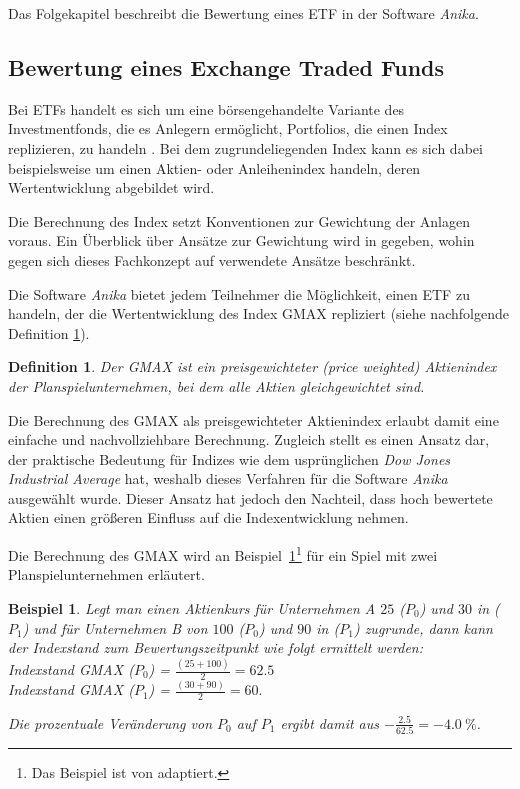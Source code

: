 \documentclass[12pt, a4paper]{article}
\theoremstyle{plain}
\newtheorem{definition}{Definition}
\newtheorem{example}{Beispiel}
\begin{document}
Das Folgekapitel beschreibt die Bewertung eines \gls{ETF} in der Software \textit{Anika}.

\subsection{Bewertung eines Exchange Traded Funds}
\label{sec:bewertung_eines_exchange_traded_funds}

Bei \glspl{ETF} handelt es sich um eine börsengehandelte Variante des Investmentfonds, die es Anlegern ermöglicht, Portfolios, die einen Index replizieren, zu handeln \autocite[][S.~103]{bodie_investments_2018}. Bei dem zugrundeliegenden Index kann es sich dabei beispielsweise um einen Aktien- oder Anleihenindex handeln, deren Wertentwicklung abgebildet wird.

Die Berechnung des Index setzt Konventionen zur Gewichtung der Anlagen voraus. Ein Überblick über Ansätze zur Gewichtung wird in \textcite[][S.~44~ff.]{bodie_investments_2018} gegeben, wohin gegen sich dieses Fachkonzept auf verwendete Ansätze beschränkt.

Die Software \textit{Anika} bietet jedem Teilnehmer die Möglichkeit, einen ETF zu handeln, der die Wertentwicklung des Index \gls{GMAX} repliziert (siehe nachfolgende Definition \ref{def:gmax}).

\begin{definition}
	\label{def:gmax}
	Der \gls{GMAX} ist ein preisgewichteter (\textit{price weighted}) Aktienindex der Planspielunternehmen, bei dem alle Aktien gleichgewichtet sind.
\end{definition}

Die Berechnung des \gls{GMAX} als preisgewichteter Aktienindex erlaubt damit eine einfache und nachvollziehbare Berechnung. Zugleich stellt es einen Ansatz dar, der praktische Bedeutung für Indizes wie dem usprünglichen \textit{Dow Jones Industrial Average} hat, weshalb dieses Verfahren für die Software \textit{Anika} ausgewählt wurde. Dieser Ansatz hat jedoch den Nachteil, dass hoch bewertete Aktien einen größeren Einfluss auf die Indexentwicklung nehmen.

Die Berechnung des \gls{GMAX} wird an Beispiel~\ref{ex:gmax}\footnote{Das Beispiel ist von \textcite[][S.~44]{bodie_investments_2018} adaptiert.} für ein Spiel mit zwei Planspielunternehmen erläutert.

\begin{example}
\label{ex:gmax}
Legt man einen Aktienkurs für Unternehmen A $25$ ($P_0$) und $30$ in ($P_1$) und für Unternehmen B von $100$ ($P_0$) und $90$ in ($P_1$) zugrunde, dann kann der Indexstand zum Bewertungszeitpunkt wie folgt ermittelt werden:\\
Indexstand \gls{GMAX} ($P_0$) = $\frac{(25 + 100)}{2} = 62.5$\\
Indexstand \gls{GMAX} ($P_1$) = $\frac{(30 + 90)}{2} = 60.$

Die prozentuale Veränderung von $P_0$ auf $P_1$ ergibt damit aus $-\frac{2.5}{62.5} = -4.0~\%$.
\end{example}
\end{document}
